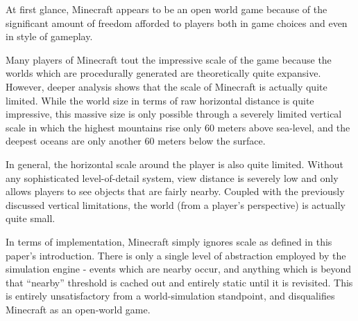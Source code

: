 At first glance, Minecraft appears to be an open world game because of the significant amount of freedom afforded to players both in game choices and even in style of gameplay.

Many players of Minecraft tout the impressive scale of the game because the worlds which are procedurally generated are theoretically quite expansive. However, deeper analysis shows that the scale of Minecraft is actually quite limited. While the world size in terms of raw horizontal distance is quite impressive, this massive size is only possible through a severely limited vertical scale in which the highest mountains rise only 60 meters above sea-level, and the deepest oceans are only another 60 meters below the surface.

In general, the horizontal scale around the player is also quite limited. Without any sophisticated level-of-detail system, view distance is severely low
and only allows players to see objects that are fairly nearby. Coupled with the previously discussed vertical limitations, the world (from a player's perspective) is actually quite small.

In terms of implementation, Minecraft simply ignores scale as defined in this paper's introduction. There is only a single level of abstraction employed by
the simulation engine - events which are nearby occur, and anything which is beyond that ``nearby'' threshold is cached out and entirely static until it is
revisited. This is entirely unsatisfactory from a world-simulation standpoint, and disqualifies Minecraft as an open-world game.

